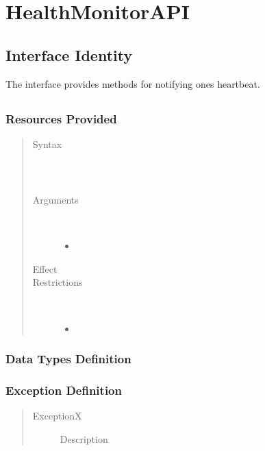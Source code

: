 \section{HealthMonitorAPI}

\subsection{Interface Identity}

\npar The  interface provides methods for notifying
ones heartbeat.

\subsection{} %

\subsubsection{Resources Provided}

\begin{quote}
	\begin{description}
		\item[Syntax] \
		\begin{verbatim}

		\end{verbatim}
		\item[Arguments] \
		\begin{itemize}
		  \item 
		\end{itemize}
		\item[Effect]
		\item[Restrictions] \
		\begin{itemize}
		  \item 
		\end{itemize}
	\end{description} 
\end{quote}

\subsubsection{Data Types Definition}

\begin{quote}
	\begin{description}
		\item[] 
	\end{description} 
\end{quote}

\subsubsection{Exception Definition} 

\begin{quote}
	\begin{description}
		\item[ExceptionX] Description
	\end{description} 
\end{quote}